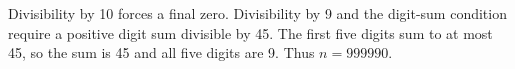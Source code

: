 Divisibility by 10 forces a final zero. Divisibility by 9 and the digit-sum condition require a positive digit sum divisible by 45. The first five digits sum to at most 45, so the sum is 45 and all five digits are 9. Thus $\boxed{n=999990}$.

